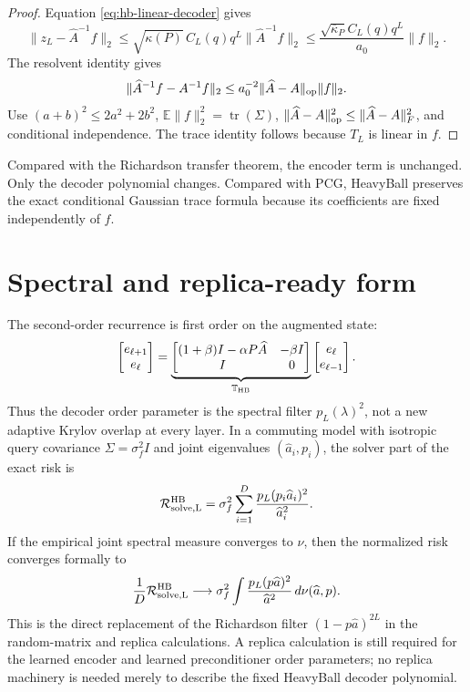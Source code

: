 \begin{proof}
Equation \eqref{eq:hb-linear-decoder} gives
\[
 \|z_L-\widehat A^{-1}f\|_2
 \leq
 \sqrt{\kappa(P)}\,C_L(q)q^L
 \|\widehat A^{-1}f\|_2
 \leq
 \frac{\sqrt{\overline\kappa_P}C_L(q)q^L}{a_0}\|f\|_2.
\]
The resolvent identity gives
\[
 \|\widehat A^{-1}f-A^{-1}f\|_2
 \leq a_0^{-2}\|\widehat A-A\|_{\rm op}\|f\|_2.
\]
Use $(a+b)^2\leq2a^2+2b^2$,
$\mathbb E\|f\|_2^2=\operatorname{tr}(\Sigma)$,
$\|\widehat A-A\|_{\rm op}^2\leq\|\widehat A-A\|_F^2$,
and conditional independence.  The trace identity follows because $T_L$ is
linear in $f$.
\end{proof}

Compared with the Richardson transfer theorem, the encoder term is unchanged.
Only the decoder polynomial changes.  Compared with PCG, HeavyBall preserves
the exact conditional Gaussian trace formula because its coefficients are
fixed independently of $f$.

\section{Spectral and replica-ready form}
\label{sec:hb-replica}

The second-order recurrence is first order on the augmented state:
\begin{equation}
 \begin{bmatrix}e_{\ell+1}\\e_\ell\end{bmatrix}
 =
 \underbrace{\begin{bmatrix}
 (1+\beta)I-\alpha P\widehat A&-\beta I\\
 I&0
 \end{bmatrix}}_{\mathbb T_{\rm HB}}
 \begin{bmatrix}e_\ell\\e_{\ell-1}\end{bmatrix}.
 \label{eq:hb-augmented-state}
\end{equation}
Thus the decoder order parameter is the spectral filter
$p_L(\lambda)^2$, not a new adaptive Krylov overlap at every layer.  In a
commuting model with isotropic query covariance
$\Sigma=\sigma_f^2I$ and joint eigenvalues
$(\widehat a_i,p_i)$, the solver part of the exact risk is
\begin{equation}
 \mathcal R_{\rm solve,L}^{\rm HB}
 =\sigma_f^2\sum_{i=1}^D
 \frac{p_L(p_i\widehat a_i)^2}{\widehat a_i^2}.
 \label{eq:hb-spectral-risk}
\end{equation}
If the empirical joint spectral measure converges to $\nu$, then the
normalized risk converges formally to
\begin{equation}
 \frac1D\mathcal R_{\rm solve,L}^{\rm HB}
 \longrightarrow
 \sigma_f^2\int \frac{p_L(p\widehat a)^2}{\widehat a^2}
 \,d\nu(\widehat a,p).
 \label{eq:hb-rmt-integral}
\end{equation}
This is the direct replacement of the Richardson filter
$(1-p\widehat a)^{2L}$ in the random-matrix and replica calculations.  A
replica calculation is still required for the learned encoder and learned
preconditioner order parameters; no replica machinery is needed merely to
describe the fixed HeavyBall decoder polynomial.
